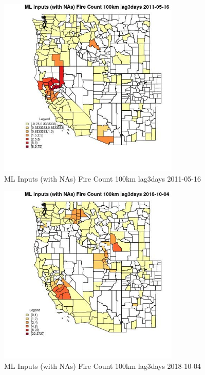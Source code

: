 \begin{figure} 
\centering  
\includegraphics[width=0.77\textwidth]{Code_Outputs/Report_ML_input_PM25_Step4_part_f_de_duplicated_aves_prioritize_24hr_obswNAs_CountyFire_Count_100km_lag3daysMean2011-05-16.jpg} 
\caption{\label{fig:Report_ML_input_PM25_Step4_part_f_de_duplicated_aves_prioritize_24hr_obswNAsCountyFire_Count_100km_lag3daysMean2011-05-16}ML Inputs (with NAs) Fire Count 100km lag3days 2011-05-16} 
\end{figure} 
 

\begin{figure} 
\centering  
\includegraphics[width=0.77\textwidth]{Code_Outputs/Report_ML_input_PM25_Step4_part_f_de_duplicated_aves_prioritize_24hr_obswNAs_CountyFire_Count_100km_lag3daysMean2018-10-04.jpg} 
\caption{\label{fig:Report_ML_input_PM25_Step4_part_f_de_duplicated_aves_prioritize_24hr_obswNAsCountyFire_Count_100km_lag3daysMean2018-10-04}ML Inputs (with NAs) Fire Count 100km lag3days 2018-10-04} 
\end{figure} 
 

